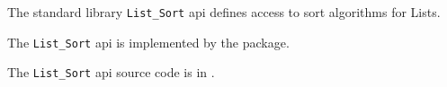 
The standard library {\tt List\_Sort} api defines access to sort algorithms 
for Lists.

The {\tt List\_Sort} api is implemented by the  package.

The {\tt List\_Sort} api source code is in .

